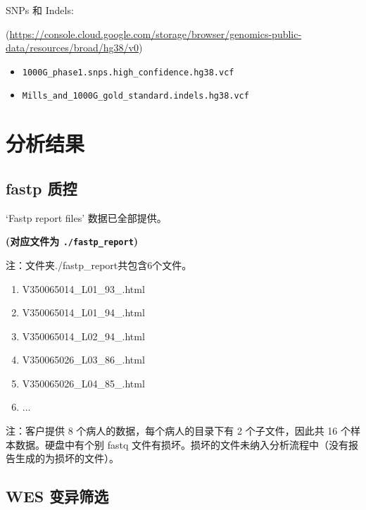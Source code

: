 \documentclass[
]{article}
\providecommand{\tightlist}{%
  \setlength{\itemsep}{0pt}\setlength{\parskip}{0pt}}
\begin{document}
SNPs 和 Indels:

(\url{https://console.cloud.google.com/storage/browser/genomics-public-data/resources/broad/hg38/v0})

\begin{itemize}
\tightlist
\item
  \texttt{1000G\_phase1.snps.high\_confidence.hg38.vcf}
\item
  \texttt{Mills\_and\_1000G\_gold\_standard.indels.hg38.vcf}
\end{itemize}

\hypertarget{results}{%
\section{分析结果}\label{results}}

\hypertarget{fastp-ux8d28ux63a7-1}{%
\subsection{fastp 质控}\label{fastp-ux8d28ux63a7-1}}

`Fastp report files' 数据已全部提供。

\textbf{(对应文件为 \texttt{./fastp\_report})}

\begin{center}\begin{tcolorbox}[colback=gray!10, colframe=gray!50, width=0.9\linewidth, arc=1mm, boxrule=0.5pt]注：文件夹./fastp\_report共包含6个文件。

\begin{enumerate}\tightlist
\item V350065014\_L01\_93\_.html
\item V350065014\_L01\_94\_.html
\item V350065014\_L02\_94\_.html
\item V350065026\_L03\_86\_.html
\item V350065026\_L04\_85\_.html
\item ...
\end{enumerate}\end{tcolorbox}
\end{center}

注：客户提供 8 个病人的数据，每个病人的目录下有 2 个子文件，因此共 16 个样本数据。硬盘中有个别 fastq 文件有损坏。损坏的文件未纳入分析流程中（没有报告生成的为损坏的文件）。

\hypertarget{wes-ux53d8ux5f02ux7b5bux9009}{%
\subsection{WES 变异筛选}\label{wes-ux53d8ux5f02ux7b5bux9009}}
\end{document}
